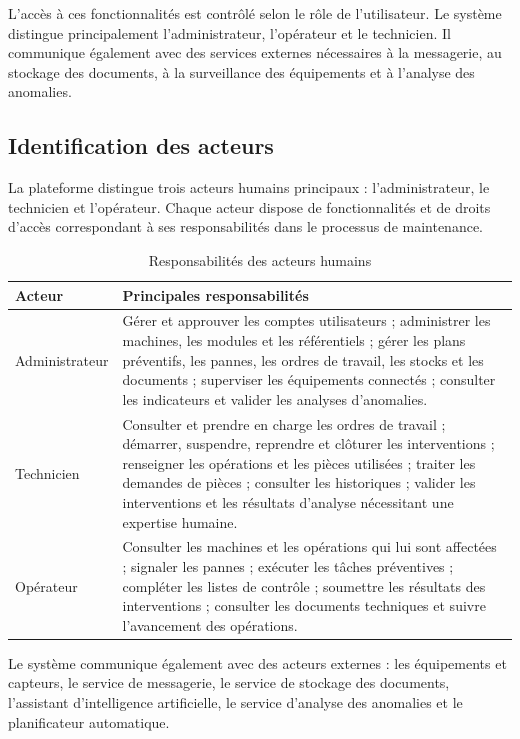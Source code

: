 L’accès à ces fonctionnalités est contrôlé selon le rôle de l’utilisateur. Le système distingue principalement l’administrateur, l’opérateur et le technicien. Il communique également avec des services externes nécessaires à la messagerie, au stockage des documents, à la surveillance des équipements et à l’analyse des anomalies.

\subsection{Identification des acteurs}

La plateforme distingue trois acteurs humains principaux : l’administrateur, le technicien et l’opérateur. Chaque acteur dispose de fonctionnalités et de droits d’accès correspondant à ses responsabilités dans le processus de maintenance.

\begin{table}[H]
\centering
\caption{Responsabilités des acteurs humains}
\label{tab:acteurs-humains}
\small
\begin{tabularx}{\textwidth}{|p{2.7cm}|X|}
\hline
\textbf{Acteur} & \textbf{Principales responsabilités} \\
\hline

Administrateur &
Gérer et approuver les comptes utilisateurs ; administrer les machines, les modules et les référentiels ; gérer les plans préventifs, les pannes, les ordres de travail, les stocks et les documents ; superviser les équipements connectés ; consulter les indicateurs et valider les analyses d’anomalies. \\
\hline

Technicien &
Consulter et prendre en charge les ordres de travail ; démarrer, suspendre, reprendre et clôturer les interventions ; renseigner les opérations et les pièces utilisées ; traiter les demandes de pièces ; consulter les historiques ; valider les interventions et les résultats d’analyse nécessitant une expertise humaine. \\
\hline

Opérateur &
Consulter les machines et les opérations qui lui sont affectées ; signaler les pannes ; exécuter les tâches préventives ; compléter les listes de contrôle ; soumettre les résultats des interventions ; consulter les documents techniques et suivre l’avancement des opérations. \\
\hline
\end{tabularx}
\end{table}

Le système communique également avec des acteurs externes : les équipements et capteurs, le service de messagerie, le service de stockage des documents, l’assistant d’intelligence artificielle, le service d’analyse des anomalies et le planificateur automatique.

